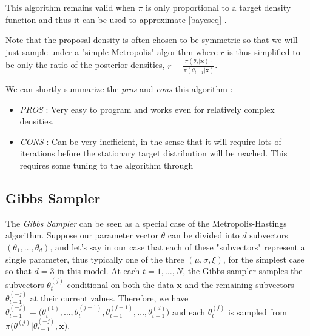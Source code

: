 \documentclass[11pt,a4paper,openany ]{book}
\begin{document}
This algorithm remains valid when $\pi$ is only proportional to a target density function and thus it can be used to approximate \ref{bayeseq} . 

Note that the proposal density is often chosen to be symmetric so that we will just sample under a "simple Metropolis" algorithm where $r$ is thus simplified to be only the ratio of the posterior densities, $r=\frac{\pi(\theta_*|\boldsymbol{x})\cdot }{\pi(\theta_{t-1}|\boldsymbol{x})}$.

We can shortly summarize the \emph{pros} and \emph{cons} this algorithm :

\begin{itemize}
	\item \emph{PROS} : Very easy to program and works even for relatively complex densities.
	\item \emph{CONS} : Can be very inefficient, in the sense that it will require lots of iterations before the stationary target distribution will be reached. This requires some tuning to the algorithm through 
\end{itemize}


\subsection{Gibbs Sampler}

The \emph{Gibbs Sampler} can be seen as a special case of the Metropolis-Hastings algorithm.
Suppose our parameter vector $\theta$ can be divided into $d$ subvectors $(\theta_1,\dots,\theta_d)$, and let's say in our case that each of these "subvectors" represent a single parameter, thus typically one of the three $(\mu,\sigma,\xi)$, for the simplest case so that $d=3$ in this model.
At each $t=1,\dots,N$, the Gibbs sampler samples the subvectors $\theta_t^{(j)}$ conditional on both the data $\boldsymbol{x}$ and the remaining subvectors $\theta_{t-1}^{(-j)}$ at their current values.
Therefore, we have $\theta_{t-1}^{(-j)}=\Big(\theta_t^{(1)},\dots,\theta_t^{(j-1)},\theta_{t-1}^{(j+1)},\dots,\theta_{t-1}^{(d)}\Big)$ and each $\theta_t^{(j)}$ is sampled from $\pi\Big(\theta^{(j)}|\theta_{t-1}^{(-j)},\boldsymbol{x}\Big)$. \\
\end{document}
